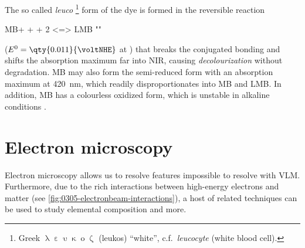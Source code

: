 \documentclass[draft,webedition,openright,titles,swedish,english]{LuaUUThesis}\usepackage[]{graphicx}\usepackage[]{xcolor}
\newcommand{\cf}{c.f.}
\begin{document}
The so called \emph{leuco}%
\footnote{%
   Greek $\uplambda\upepsilon\upupsilon\upkappa\upomicron\upzeta$ (leukos) \enquote{white},
   \cf\ \emph{leucocyte} (white blood cell).}
form of the dye is formed in the reversible reaction
\begin{reaction}
MB+ + \proton{} + 2 \electron{} <=> LMB
 "\label{rxn:leuco-methylene-blue}"
\end{reaction}
($E^0=\qty{0.011}{\voltNHE}$ at )
that breaks the conjugated bonding and shifts the absorption maximum far into
\gls{NIR}, causing \emph{decolourization} without degradation.
\Gls{MB} may also form the semi-reduced form  with an absorption maximum
at \qty{420}{\nm}, which readily disproportionates into MB and LMB. In addition,
\gls{MB} has a colourless oxidized form,  which is unstable in alkaline
conditions \cite{Mills1999}.





\section{Electron microscopy}%
\label{methods:electron-microscopy}

Electron microscopy allows us to resolve features
impossible to resolve with \gls{VLM}.
Furthermore, due to the rich interactions between high-energy electrons
and matter (see \cref{fig:0305-electronbeam-interactions}), a host of related
techniques can be used to study elemental composition and more.

%
\end{document}
